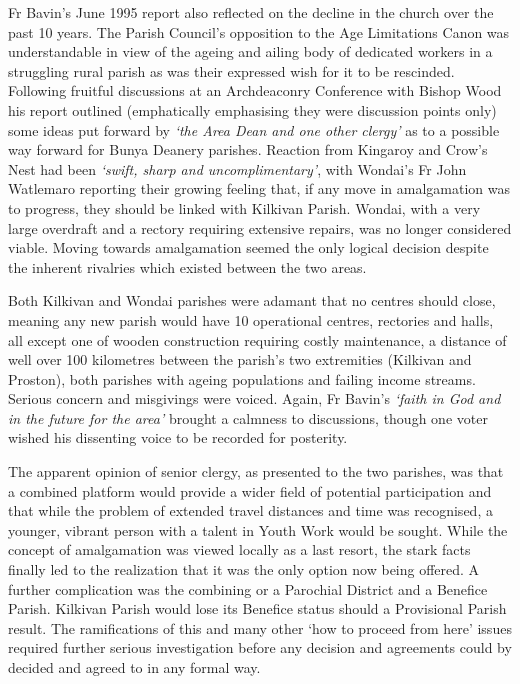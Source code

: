 Fr Bavin's June 1995 report also reflected on the decline in the church over the past 10 years. The Parish Council's opposition to the Age Limitations Canon was understandable in view of the ageing and ailing body of dedicated workers in a struggling rural parish as was their expressed wish for it to be rescinded. Following fruitful discussions at an Archdeaconry Conference with Bishop Wood his report outlined (emphatically emphasising they were discussion points only) some ideas put forward by \emph{`the Area Dean and one other clergy'} as to a possible way forward for Bunya Deanery parishes. Reaction from Kingaroy and Crow's Nest had been \emph{`swift, sharp and uncomplimentary'}, with Wondai's Fr John Watlemaro reporting their growing feeling that, if any move in amalgamation was to progress, they should be linked with Kilkivan Parish. Wondai, with a very large overdraft and a rectory requiring extensive repairs, was no longer considered viable. Moving towards amalgamation seemed the only logical decision despite the inherent rivalries which existed between the two areas.



Both Kilkivan and Wondai parishes were adamant that no centres should close, meaning any new parish would have 10 operational centres, rectories and halls, all except one of wooden construction requiring costly maintenance, a distance of well over 100 kilometres between the parish's two extremities (Kilkivan and Proston), both parishes with ageing populations and failing income streams. Serious concern and misgivings were voiced. Again, Fr Bavin's \emph{`faith in God and in the future for the area'} brought a calmness to discussions, though one voter wished his dissenting voice to be recorded for posterity.



The apparent opinion of senior clergy, as presented to the two parishes, was that a combined platform would provide a wider field of potential participation and that while the problem of extended travel distances and time was recognised, a younger, vibrant person with a talent in Youth Work would be sought. While the concept of amalgamation was viewed locally as a last resort, the stark facts finally led to the realization that it was the only option now being offered. A further complication was the combining or a Parochial District and a Benefice Parish. Kilkivan Parish would lose its Benefice status should a Provisional Parish result. The ramifications of this and many other `how to proceed from here' issues required further serious investigation before any decision and agreements could by decided and agreed to in any formal way.



